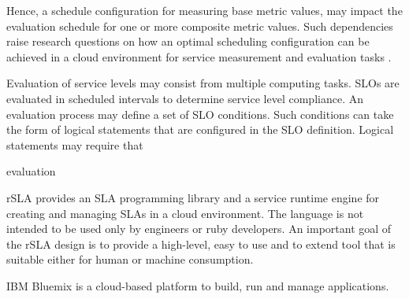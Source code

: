 Hence, a schedule configuration for measuring base metric values, may impact the evaluation schedule for one or more composite metric values. Such dependencies raise research questions on how an optimal scheduling configuration can be achieved in a cloud environment for service measurement and evaluation tasks . 

Evaluation of service levels may consist from multiple computing tasks. SLOs are evaluated in scheduled intervals to determine service level compliance. An evaluation process may define a set of SLO conditions.  Such conditions can take the form of logical statements that are configured in the SLO definition. Logical statements may require that 


evaluation

rSLA provides an SLA programming library and a service runtime engine for creating and managing SLAs in a cloud environment. The language is not intended to be used only by engineers or ruby developers. An important goal of the rSLA design is to provide a high-level, easy to use and to extend tool that is suitable either for human or machine consumption.


IBM Bluemix is a cloud-based platform to build, run and manage applications. 
